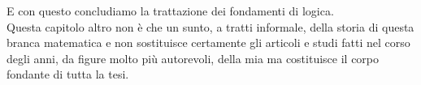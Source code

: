 E con questo concludiamo la trattazione dei fondamenti di logica.\\ 
Questa capitolo altro non è che un sunto, a tratti informale, della storia di questa branca matematica  
e non sostituisce certamente gli articoli e studi fatti nel corso degli anni, da figure molto più autorevoli,
della mia ma costituisce il corpo fondante di tutta la tesi.





